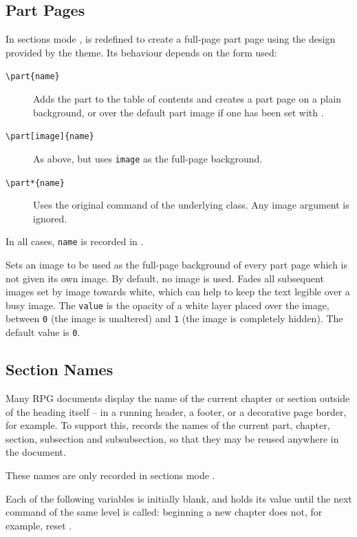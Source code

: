 		\subsection{Part Pages}

			{
				In sections mode ,  is redefined to create a full-page part page using the design provided by the theme. Its behaviour depends on the form used:
				\begin{description}
					\item[{\texttt{\textbackslash{}part\{name\}}}] Adds the part to the table of contents and creates a part page on a plain background, or over the default part image if one has been set with .
					\item[{\texttt{\textbackslash{}part[image]\{name\}}}] As above, but uses \texttt{image} as the full-page background.
					\item[{\texttt{\textbackslash{}part*\{name\}}}] Uses the original  command of the underlying class. Any image argument is ignored.
				\end{description}
				In all cases, \texttt{name} is recorded in .
			}
			{
				Sets an image to be used as the full-page background of every part page which is not given its own image. By default, no image is used.
			}
			{
				Fades all subsequent images set by  image towards white, which can help to keep the text legible over a busy image. The \texttt{value} is the opacity of a white layer placed over the image, between \texttt{0} (the image is unaltered) and \texttt{1} (the image is completely hidden). The default value is \texttt{0}.
			}
		\subsection{Section Names}\label{S:SectionNames}
			Many RPG documents display the name of the current chapter or section outside of the heading itself -- in a running header, a footer, or a decorative page border, for example. To support this, \rpgtex{} records the names of the current part, chapter, section, subsection and subsubsection, so that they may be reused anywhere in the document.

			These names are only recorded in sections mode .


			Each of the following variables is initially blank, and holds its value until the next command of the same level is called: beginning a new chapter does not, for example, reset .

